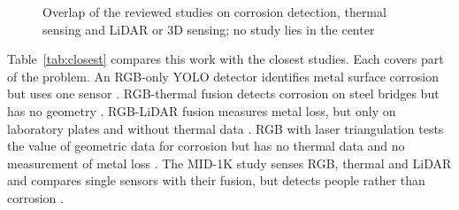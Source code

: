 \begin{figure}[htbp]
\centering
{}
\caption[Overlap of the reviewed studies]{Overlap of the reviewed studies on corrosion detection, thermal sensing
and LiDAR or 3D sensing; no study lies in the center}
\label{fig:gap}
\end{figure}

Table~\ref{tab:closest} compares this work with the closest studies. Each covers
part of the problem. An RGB-only YOLO detector identifies metal surface corrosion
but uses one sensor \citep{Fu2024}. RGB-thermal fusion detects corrosion on steel bridges
but has no geometry \citep{Lim2021}. RGB-LiDAR fusion measures metal loss, but only on
laboratory plates and without thermal data \citep{Maru2025}. RGB with laser triangulation
tests the value of geometric data for corrosion but has no thermal data and no
measurement of metal loss \citep{Haitz2022}. The MID-1K study senses RGB, thermal and
LiDAR and compares single sensors with their fusion, but detects people rather
than corrosion \citep{Mota2024}.

